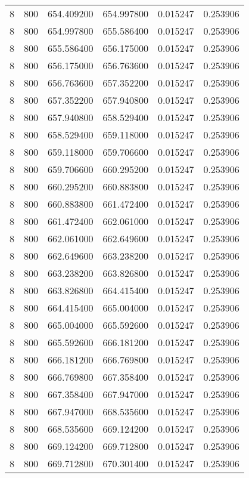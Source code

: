 \begin{longtable}{rrrrrr}
8 & 800 & 654.409200 & 654.997800 & 0.015247 & 0.253906 \\
8 & 800 & 654.997800 & 655.586400 & 0.015247 & 0.253906 \\
8 & 800 & 655.586400 & 656.175000 & 0.015247 & 0.253906 \\
8 & 800 & 656.175000 & 656.763600 & 0.015247 & 0.253906 \\
8 & 800 & 656.763600 & 657.352200 & 0.015247 & 0.253906 \\
8 & 800 & 657.352200 & 657.940800 & 0.015247 & 0.253906 \\
8 & 800 & 657.940800 & 658.529400 & 0.015247 & 0.253906 \\
8 & 800 & 658.529400 & 659.118000 & 0.015247 & 0.253906 \\
8 & 800 & 659.118000 & 659.706600 & 0.015247 & 0.253906 \\
8 & 800 & 659.706600 & 660.295200 & 0.015247 & 0.253906 \\
8 & 800 & 660.295200 & 660.883800 & 0.015247 & 0.253906 \\
8 & 800 & 660.883800 & 661.472400 & 0.015247 & 0.253906 \\
8 & 800 & 661.472400 & 662.061000 & 0.015247 & 0.253906 \\
8 & 800 & 662.061000 & 662.649600 & 0.015247 & 0.253906 \\
8 & 800 & 662.649600 & 663.238200 & 0.015247 & 0.253906 \\
8 & 800 & 663.238200 & 663.826800 & 0.015247 & 0.253906 \\
8 & 800 & 663.826800 & 664.415400 & 0.015247 & 0.253906 \\
8 & 800 & 664.415400 & 665.004000 & 0.015247 & 0.253906 \\
8 & 800 & 665.004000 & 665.592600 & 0.015247 & 0.253906 \\
8 & 800 & 665.592600 & 666.181200 & 0.015247 & 0.253906 \\
8 & 800 & 666.181200 & 666.769800 & 0.015247 & 0.253906 \\
8 & 800 & 666.769800 & 667.358400 & 0.015247 & 0.253906 \\
8 & 800 & 667.358400 & 667.947000 & 0.015247 & 0.253906 \\
8 & 800 & 667.947000 & 668.535600 & 0.015247 & 0.253906 \\
8 & 800 & 668.535600 & 669.124200 & 0.015247 & 0.253906 \\
8 & 800 & 669.124200 & 669.712800 & 0.015247 & 0.253906 \\
8 & 800 & 669.712800 & 670.301400 & 0.015247 & 0.253906 \\

\end{longtable}
